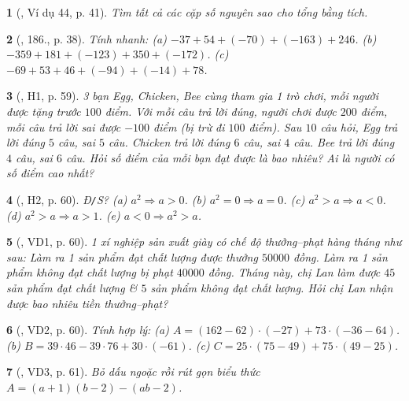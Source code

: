 \documentclass{article}
\newtheorem{baitoan}{}
\begin{document}
\begin{baitoan}[\cite{Tuyen_Toan_6}, Ví dụ 44, p. 41]
	Tìm tất cả các cặp số nguyên sao cho tổng bằng tích.
\end{baitoan}

\begin{baitoan}[\cite{Tuyen_Toan_6}, 186., p. 38]
	Tính nhanh: (a) $-37 + 54 + (-70) + (-163) + 246$. (b) $-359 + 181 + (-123) + 350 + (-172)$. (c) $-69 + 53 + 46 + (-94) + (-14) + 78$.
\end{baitoan}

\begin{baitoan}[\cite{Binh_boi_duong_Toan_6_tap_1}, H1, p. 59]
	3 bạn Egg, Chicken, Bee cùng tham gia 1 trò chơi, mỗi người được tặng trước $100$ điểm. Với mỗi câu trả lời đúng, người chơi được $200$ điểm, mỗi câu trả lời sai được $-100$ điểm (bị trừ đi $100$ điểm). Sau $10$ câu hỏi, Egg trả lời đúng $5$ câu, sai $5$ câu. Chicken trả lời đúng $6$ câu, sai $4$ câu. Bee trả lời đúng $4$ câu, sai $6$ câu. Hỏi số điểm của mỗi bạn đạt được là bao nhiêu? Ai là người có số điểm cao nhất?
\end{baitoan}

\begin{baitoan}[\cite{Binh_boi_duong_Toan_6_tap_1}, H2, p. 60]
	{\rm Đ{\tt/}S?} (a) $a^2\Rightarrow a > 0$. (b) $a^2 = 0\Rightarrow a = 0$. (c) $a^2 > a\Rightarrow a < 0$. (d) $a^2 > a\Rightarrow a > 1$. (e) $a < 0\Rightarrow a^2 > a$.
\end{baitoan}

\begin{baitoan}[\cite{Binh_boi_duong_Toan_6_tap_1}, VD1, p. 60]
	1 xí nghiệp sản xuất giày có chế độ thưởng--phạt hàng tháng như sau: Làm ra 1 sản phẩm đạt chất lượng được thưởng $50000$ đồng. Làm ra 1 sản phẩm không đạt chất lượng bị phạt $40000$ đồng. Tháng này, chị Lan làm được $45$ sản phẩm đạt chất lượng \& $5$ sản phẩm không đạt chất lượng. Hỏi chị Lan nhận được bao nhiêu tiền thưởng--phạt?
\end{baitoan}

\begin{baitoan}[\cite{Binh_boi_duong_Toan_6_tap_1}, VD2, p. 60]
	Tính hợp lý: (a) $A = (162 - 62)\cdot(-27) + 73\cdot(-36 - 64)$. (b) $B = 39\cdot46 - 39\cdot76 + 30\cdot(-61)$. (c) $C = 25\cdot(75 - 49) + 75\cdot(49 - 25)$.
\end{baitoan}

\begin{baitoan}[\cite{Binh_boi_duong_Toan_6_tap_1}, VD3, p. 61]
	Bỏ dấu ngoặc rồi rút gọn biểu thức $A = (a + 1)(b - 2) - (ab - 2)$.
\end{baitoan}
\end{document}
